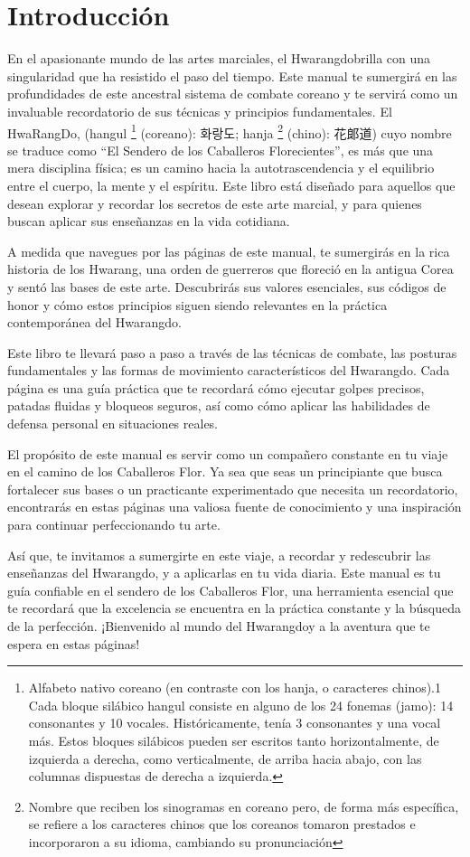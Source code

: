 \chapter{Introducción}

En el apasionante mundo de las artes marciales, el Hwarangdo\textregistered brilla con una singularidad que ha resistido el paso del tiempo. Este manual te sumergirá en las profundidades de este ancestral sistema de combate coreano y te servirá como un invaluable recordatorio de sus técnicas y principios fundamentales.
El HwaRangDo\textregistered, (hangul
\footnote[1]{Alfabeto nativo coreano (en contraste con los hanja, o caracteres chinos).1​ Cada bloque silábico hangul consiste en alguno de los 24 fonemas (jamo): 14 consonantes y 10 vocales. Históricamente, tenía 3 consonantes y una vocal más.
Estos bloques silábicos pueden ser escritos tanto horizontalmente, de izquierda a derecha, como verticalmente, de arriba hacia abajo, con las columnas dispuestas de derecha a izquierda.} (coreano): 화랑도;
hanja \footnote[2]{Nombre que reciben los sinogramas
en coreano pero, de forma más específica, se refiere a
los caracteres chinos que los coreanos tomaron prestados
e incorporaron a su idioma, cambiando su pronunciación} (chino): 花郞道) cuyo nombre se traduce como ``El Sendero de los Caballeros Florecientes'', es más que una mera disciplina física; es un camino hacia la autotrascendencia y el equilibrio entre el cuerpo, la mente y el espíritu. Este libro está diseñado para aquellos que desean explorar y recordar los secretos de este arte marcial, y para quienes buscan aplicar sus enseñanzas en la vida cotidiana.

A medida que navegues por las páginas de este manual, te sumergirás en la rica historia de los Hwarang, una orden de guerreros que floreció en la antigua Corea y sentó las bases de este arte. Descubrirás sus valores esenciales, sus códigos de honor y cómo estos principios siguen siendo relevantes en la práctica contemporánea del Hwarangdo\textregistered.

Este libro te llevará paso a paso a través de las técnicas de combate, las posturas fundamentales y las formas de movimiento característicos del Hwarangdo\textregistered. Cada página es una guía práctica que te recordará cómo ejecutar golpes precisos, patadas fluidas y bloqueos seguros, así como cómo aplicar las habilidades de defensa personal en situaciones reales.

El propósito de este manual es servir como un compañero constante en tu viaje en el camino de los Caballeros Flor. Ya sea que seas un principiante que busca fortalecer sus bases o un practicante experimentado que necesita un recordatorio, encontrarás en estas páginas una valiosa fuente de conocimiento y una inspiración para continuar perfeccionando tu arte.

Así que, te invitamos a sumergirte en este viaje, a recordar y redescubrir las enseñanzas del Hwarangdo\textregistered, y a aplicarlas en tu vida diaria. Este manual es tu guía confiable en el sendero de los Caballeros Flor, una herramienta esencial que te recordará que la excelencia se encuentra en la práctica constante y la búsqueda de la perfección. ¡Bienvenido al mundo del Hwarangdo\textregistered y a la aventura que te espera en estas páginas!